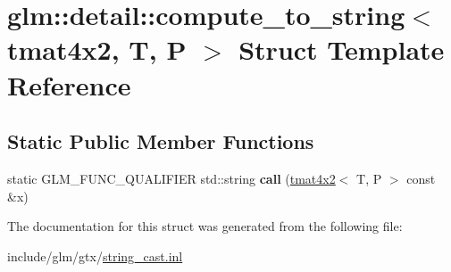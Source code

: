 \hypertarget{structglm_1_1detail_1_1compute__to__string_3_01tmat4x2_00_01T_00_01P_01_4}{}\section{glm\+:\+:detail\+:\+:compute\+\_\+to\+\_\+string$<$ tmat4x2, T, P $>$ Struct Template Reference}
\label{structglm_1_1detail_1_1compute__to__string_3_01tmat4x2_00_01T_00_01P_01_4}
\subsection*{Static Public Member Functions}
\begin{DoxyCompactItemize}
\item 
\mbox{\label{structglm_1_1detail_1_1compute__to__string_3_01tmat4x2_00_01T_00_01P_01_4_a1371cdf230f35b3c1fbd8cfad23bd364}} 
static G\+L\+M\+\_\+\+F\+U\+N\+C\+\_\+\+Q\+U\+A\+L\+I\+F\+I\+ER std\+::string {\bfseries call} (\hyperlink{structglm_1_1tmat4x2}{tmat4x2}$<$ T, P $>$ const \&x)
\end{DoxyCompactItemize}


The documentation for this struct was generated from the following file\+:\begin{DoxyCompactItemize}
\item 
include/glm/gtx/\hyperlink{string__cast_8inl}{string\+\_\+cast.\+inl}\end{DoxyCompactItemize}
